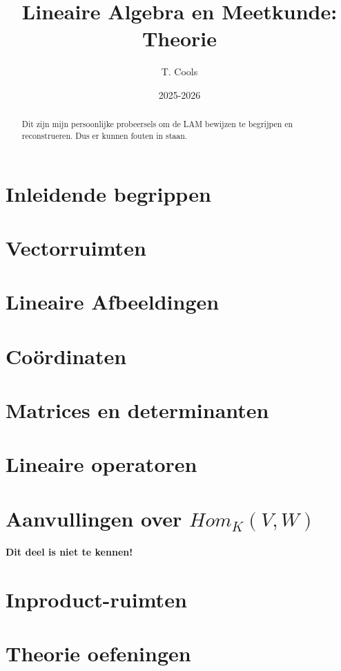 \documentclass[a4paper,twoside]{article}
\title{Lineaire Algebra en Meetkunde: Theorie}
\author{T. Cools}
\date{2025-2026}
\theoremstyle{definition}
\theoremstyle{plain}
\begin{document}
\maketitle

\begin{abstract}
    Dit zijn mijn persoonlijke probeersels om de LAM bewijzen te begrijpen en reconstrueren.
    Dus er kunnen fouten in staan.

\end{abstract}


\section{Inleidende begrippen}

\section{Vectorruimten}

\section{Lineaire Afbeeldingen}

\section{Coördinaten}

\section{Matrices en determinanten}

\section{Lineaire operatoren}


\section{Aanvullingen over \(Hom_K(V,W)\)}
\textbf{Dit deel is niet te kennen!}
\section{Inproduct-ruimten}

\section{Theorie oefeningen}

\end{document}
